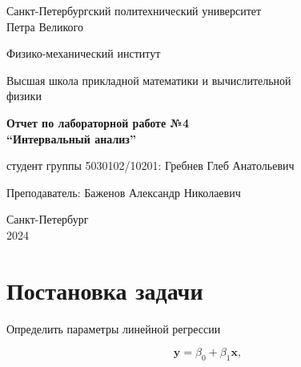 \documentclass{article}
\begin{document}
  \begin{titlepage}
    \begin{center}
      Санкт-Петербургский политехнический университет \\Петра Великого
    \end{center}

    \begin{center}
      Физико-механический институт
    \end{center}

    \begin{center}
      Высшая школа прикладной математики и вычислительной\\ физики
    \end{center}

    \vspace{8em}

    \begin{center}
      \textbf{Отчет по лабораторной работе №4}\\
      \textbf{“Интервальный анализ”}
    \end{center}

    \vspace{\fill}

    \begin{flushright}
       студент группы 5030102/10201:
      \hfill
      Гребнев Глеб Анатольевич \\
    \end{flushright}
    Преподаватель: \hfill Баженов Александр Николаевич

    \vspace{12em}

    \begin{center}
      Санкт-Петербург\\
      2024
    \end{center}
  \end{titlepage}

  \tableofcontents

  \newpage

  \section{Постановка задачи}

  Определить параметры линейной регрессии

  \begin{equation} \label{eq:islau}
    \mathbf{y} = \beta_0 + \beta_1 \mathbf{x},
  \end{equation}
\end{document}
